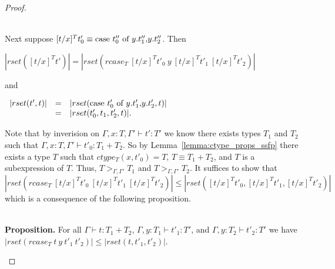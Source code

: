 \begin{proof}
\begin{itemize}
  \ \\
  Next suppose $[t/x]^T t'_0 \equiv \mbox{case}\ t''_0\ \text{of}\ y\text{.}t''_1\text{,}y\text{.}t''_2$.  Then 
  \begin{center}
    \begin{math}
      |rset([t/x]^T t')| = |rset(rcase_{T}\ [t/x]^T t'_0\ y\ [t/x]^T t'_1\ [t/x]^T t'_2)|
    \end{math}
  \end{center}
  and
  \begin{center}
    \begin{math}
      \begin{array}{lll}
        |rset(t', t)| & = & |rset(\mbox{case}\ t'_0\ \text{of}\ y\text{.}t'_1\text{,}y\text{.}t'_2, t)|\\
        & = & |rset(t'_0,t_1,t'_2,t)|.
      \end{array}
    \end{math}
  \end{center}
  Note that by inverision on $\Gamma,x:T,\Gamma' \vdash t':T'$ we know there exists
  types $T_1$ and $T_2$ such that $\Gamma,x:T,\Gamma' \vdash t'_0:T_1+T_2$.
  So by Lemma~\ref{lemma:ctype_props_ssfp} there exists a type $T$ such that $ctype_T (x,t'_0) = T$, $T \equiv T_1+T_2$, and $T$ is a 
  subexpression of $T$. Thus, $T >_{\Gamma,\Gamma'} T_1$ and $T >_{\Gamma,\Gamma'} T_2$.
  It suffices to show that $|rset(rcase_T\ [t/x]^T t'_0\ [t/x]^T t'_1\ [t/x]^T t'_2)| \leq |rset([t/x]^T t'_0, [t/x]^T t'_1, [t/x]^T t'_2)|$ which
  is a consequence of the following proposition.
    
  \ \\
  {\bf Proposition.}  For all $\Gamma \vdash t:T_1+T_2$, $\Gamma, y:T_1 \vdash t'_1:T'$, and 
  $\Gamma, y:T_2 \vdash t'_2:T'$ we have $|rset(rcase_{T}\ t\ y\ t'_1\ t'_2)| \leq |rset(t, t'_1, t'_2)|$.
    

\end{itemize}
\end{proof}
